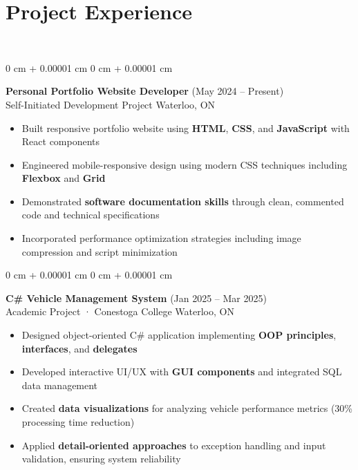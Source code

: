 \documentclass[10pt, letterpaper]{article}
\newenvironment{highlights}{
    \begin{itemize}[
        topsep=0.10 cm,
        parsep=0.10 cm,
        partopsep=0pt,
        itemsep=0pt,
        leftmargin=0 cm + 10pt
    ]
}{
    \end{itemize}
} %
\newenvironment{onecolentry}{
    \begin{adjustwidth}{
        0 cm + 0.00001 cm
    }{
        0 cm + 0.00001 cm
    }
}{
    \end{adjustwidth}
} %
\begin{document}
\vspace{-12pt}
\section{Project Experience}
\vspace{-12pt}
\hrulefill\\
\begin{onecolentry}
    {\normalsize \textbf{Personal Portfolio Website Developer}} \hfill {(May 2024 – Present)}\\
    {Self-Initiated Development Project} \hfill {Waterloo, ON}\\
    \begin{highlights}
        \item Built responsive portfolio website using \textbf{HTML}, \textbf{CSS}, and \textbf{JavaScript} with React components
        \item Engineered mobile-responsive design using modern CSS techniques including \textbf{Flexbox} and \textbf{Grid}
        \item Demonstrated \textbf{software documentation skills} through clean, commented code and technical specifications
        \item Incorporated performance optimization strategies including image compression and script minimization
    \end{highlights}
\end{onecolentry}

\begin{onecolentry}
    {\normalsize \textbf{C\# Vehicle Management System}} \hfill {(Jan 2025 – Mar 2025)}\\
    {Academic Project · Conestoga College} \hfill {Waterloo, ON}\\
    \begin{highlights}
        \item Designed object-oriented C\# application implementing \textbf{OOP principles}, \textbf{interfaces}, and \textbf{delegates}
        \item Developed interactive UI/UX with \textbf{GUI components} and integrated SQL data management
        \item Created \textbf{data visualizations} for analyzing vehicle performance metrics (30\% processing time reduction)
        \item Applied \textbf{detail-oriented approaches} to exception handling and input validation, ensuring system reliability
    \end{highlights}
\end{onecolentry}
\end{document}

